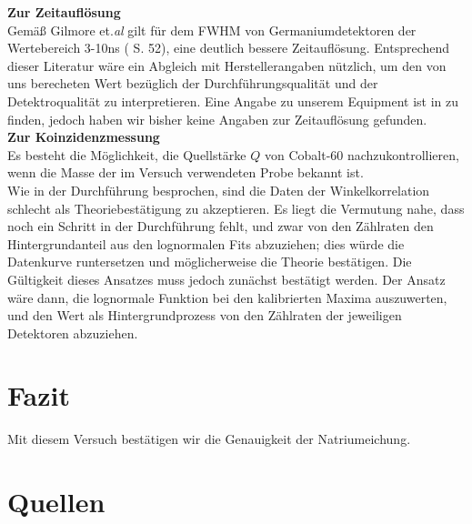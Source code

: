\documentclass[%
aps,
onecolumn,
11pt,
tightenlines,
nofootinbib,
superscriptaddress,
floatfix,
prd,
]{revtex4-2}
\begin{document}
\textbf{Zur Zeitauflösung}\\
Gemäß Gilmore et.\textit{al} gilt für dem FWHM von Germaniumdetektoren der Wertebereich 3-10ns (\cite{gilmore2008practical} S. 52), eine deutlich bessere Zeitauflösung. Entsprechend dieser Literatur wäre ein Abgleich mit Herstellerangaben nützlich, um den von uns berecheten Wert bezüglich der Durchführungsqualität und der Detektroqualität zu interpretieren. Eine Angabe zu unserem Equipment ist in \cite{ortec} zu finden, jedoch haben wir bisher keine Angaben zur Zeitauflösung gefunden.\vspace{10pt}\\
\newpage
\textbf{Zur Koinzidenzmessung}\\
Es besteht die Möglichkeit, die Quellstärke $Q$ von Cobalt-60 nachzukontrollieren, wenn die Masse der im Versuch verwendeten Probe bekannt ist.\\
Wie in der Durchführung besprochen, sind die Daten der Winkelkorrelation schlecht als Theoriebestätigung zu akzeptieren. Es liegt die Vermutung nahe, dass noch ein Schritt in der Durchführung fehlt, und zwar von den Zählraten den Hintergrundanteil aus den lognormalen Fits abzuziehen; dies würde die Datenkurve runtersetzen und möglicherweise die Theorie bestätigen. Die Gültigkeit dieses Ansatzes muss jedoch zunächst bestätigt werden. Der Ansatz wäre dann, die lognormale Funktion bei den kalibrierten Maxima auszuwerten, und den Wert als Hintergrundprozess von den Zählraten der jeweiligen Detektoren abzuziehen. 





\section{Fazit}
\label{sec:Fazit}
Mit diesem Versuch bestätigen wir die Genauigkeit der Natriumeichung. 


\section{Quellen}
\setlength{\bibsep}{6pt}


\end{document}
